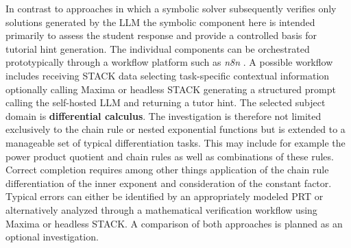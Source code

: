 \documentclass[11pt,a4paper,oneside,ngerman]{memoir}
\begin{document}
In contrast to approaches in which a symbolic solver subsequently verifies only solutions generated by the LLM the symbolic component here is intended primarily to assess the student response and provide a controlled basis for tutorial hint generation.
The individual components can be orchestrated prototypically through a workflow platform such as \textit{n8n} \autocite{n8ndocumentation}. A possible workflow includes receiving STACK data selecting task-specific contextual information optionally calling Maxima or headless STACK generating a structured prompt calling the self-hosted LLM and returning a tutor hint.
The selected subject domain is \textbf{differential calculus}. The investigation is therefore not limited exclusively to the chain rule or nested exponential functions but is extended to a manageable set of typical differentiation tasks. This may include for example the power product quotient and chain rules as well as combinations of these rules.
\hspace{1 cm}\\
Correct completion requires among other things application of the chain rule differentiation of the inner exponent and consideration of the constant factor. Typical errors can either be identified by an appropriately modeled PRT or alternatively analyzed through a mathematical verification workflow using Maxima or headless STACK. A comparison of both approaches is planned as an optional investigation.
\end{document}
